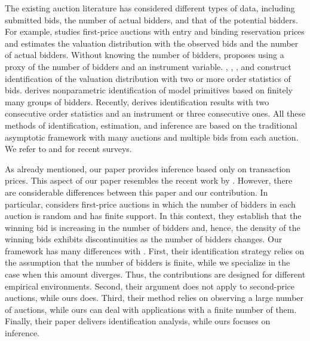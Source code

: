 The existing auction literature has considered different types of data, including submitted bids, the number of actual bidders, and that of the potential bidders. 
For example, \cite{Li2005} studies first-price auctions with entry and binding reservation prices and estimates the valuation distribution with the observed bids and the number of actual bidders. %
Without knowing the number of bidders, \cite{an2010} proposes using a proxy of the number of bidders and an instrument variable. \citet{KimLee2014}, \citet{song2015}, \citet{Mbakop2017}, and \citet{freyberger2022} construct identification of the valuation distribution with two or more order statistics of bids. \cite{shneyerov2011} derives nonparametric identification of model primitives based on finitely many groups of bidders. Recently, \citet{LuoXiao2023} derives identification results with two consecutive order statistics and an instrument or three consecutive ones. All these methods of identification, estimation, and inference are based on the traditional asymptotic framework with many auctions and multiple bids from each auction. We refer to \citet{hickman2012} and \citet{gentry2018review} for recent surveys.

As already mentioned, our paper provides inference based only on transaction prices. This aspect of our paper resembles the recent work by \cite{GuerreLuo2022}. However, there are considerable differences between this paper and our contribution. In particular, \cite{GuerreLuo2022} considers first-price auctions in which the number of bidders in each auction is random and has finite support. In this context, they establish that the winning bid is increasing in the number of bidders and, hence, the density of the winning bids exhibits discontinuities as the number of bidders changes. Our framework has many differences with \citet{GuerreLuo2022}. First, their identification strategy relies on the assumption that the number of bidders is finite, while we specialize in the case when this amount diverges. Thus, the contributions are designed for different empirical environments. Second, their argument does not apply to second-price auctions, while ours does. Third, their method relies on observing a large number of auctions, while ours can deal with applications with a finite number of them. Finally, their paper delivers identification analysis, while ours focuses on inference.

